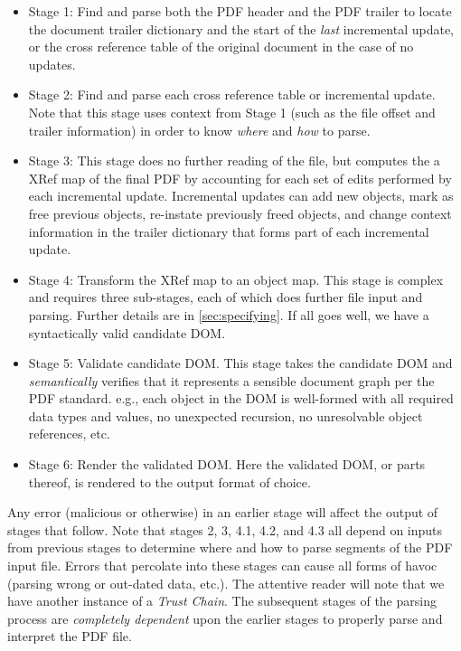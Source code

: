 \begin{itemize}
\item Stage 1: Find and parse both the PDF header and the PDF trailer to locate
  the document trailer dictionary and the start of the \emph{last} incremental update, or
  the cross reference table of the original document in the case of no updates.
\item Stage 2: Find and parse each cross reference table or incremental update. 
  Note that this stage uses context from Stage 1 (such as the file offset and trailer
  information) in order to know \emph{where} and \emph{how} to parse.
\item Stage 3: This stage does no further reading of the file, but computes the
   a XRef map of the final PDF by accounting for each set of edits performed by each incremental update.
   Incremental updates can add new objects, mark as free previous objects, re-instate previously 
   freed objects, and change context information in the trailer dictionary that 
   forms part of each incremental update.
\item Stage 4: Transform the XRef map to an object map. This stage is complex and
  requires three sub-stages, each of which does further file input and parsing.
  Further details are in \cref{sec:specifying}.
  If all goes well, we have a syntactically valid candidate DOM.
\item Stage 5: Validate candidate DOM.  This stage takes the candidate DOM and
  \emph{semantically} verifies that it represents a sensible document graph per the PDF standard.
  e.g., each object in the DOM is well-formed with all required data types and values, 
  no unexpected recursion, no unresolvable object references, etc.
\item Stage 6: Render the validated DOM. Here the validated DOM, or parts thereof, is rendered
  to the output format of choice.
\end{itemize}

Any error (malicious or otherwise) in an earlier stage will affect the output of stages that follow.
Note that stages 2, 3, 4.1, 4.2, and 4.3 all depend on inputs from previous stages to determine 
where and how to parse segments of the PDF input file.
Errors that percolate into these stages can
cause all forms of havoc (parsing wrong or out-dated data, etc.).
%
The attentive reader will note that we have another instance of a \emph{Trust
Chain}. The subsequent stages of the parsing process are \emph{completely
dependent} upon the earlier stages to properly parse and interpret the PDF
file.

